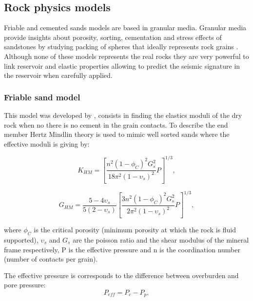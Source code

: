 

\subsection{Rock physics models}

Friable and cemented sands models are based in granular media. Granular media provide
insights about porosity, sorting, cementation and stress effects of sandstones by studying
packing of spheres that ideally represents rock grains \citep{ref:handbook}.    
Although none of these models represents the real rocks they are very powerful to
link reservoir and elastic properties allowing to predict the seismic signature
in the reservoir when carefully applied. 


\subsubsection{Friable sand model}
This model was developed by \cite{ref:dvorkin}, consists in finding the elastics moduli 
of the dry rock when no there is no cement in the grain contacts. To describe the end member
Hertz Mindlin theory is used to mimic well sorted sands where the effective moduli is giving by: 

\begin{equation}
K_{HM}=\left[\frac{n^2(1-\phi_{C})^2G_{s}^2}{18\pi^2(1-\upsilon_{s})^2}P\right]^{1/3},
  \label{eq:KHM}
\end{equation}

\begin{equation}
G_{HM}=\frac{5-4\upsilon_{s}}{5(2-\upsilon_{s})}\left[\frac{3n^2(1-\phi_{C})^2G_{s}^2}{2\pi^2(1-\upsilon_{s})^2}P\right]^{1/3},
  \label{eq:GHM}
\end{equation}

where $\phi_{C}$ is the critical porosity (minimum porosity at which the rock is fluid supported),
$\upsilon_{s}$ and $G_{s}$ are the poisson ratio and the shear modulus of the mineral frame respectively,
 P is the effective pressure and n is the coordination number (number of contacts per grain).

The effective pressure is corresponds to the difference between overburden and pore pressure: 
\begin{equation}
P_{eff}=P_{c}-P_{p},
  \label{eq:P}
\end{equation}

